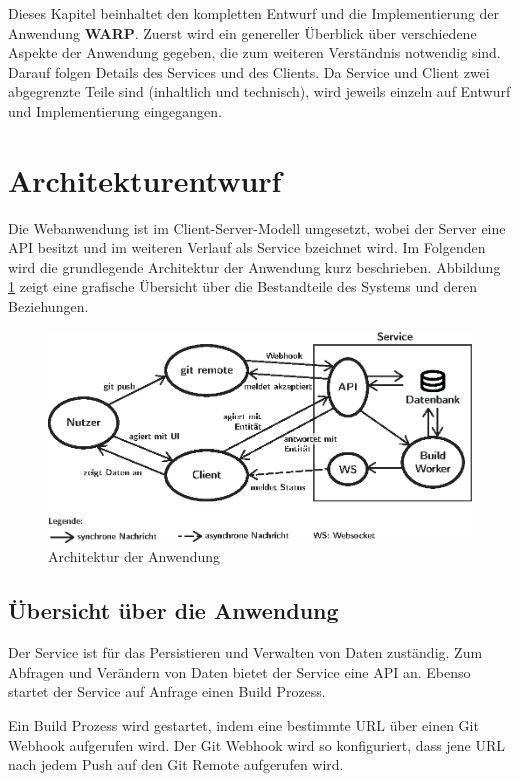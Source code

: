 Dieses Kapitel beinhaltet den kompletten Entwurf und die Implementierung der Anwendung \textbf{WARP}. Zuerst wird ein genereller Überblick über verschiedene Aspekte der Anwendung gegeben, die zum weiteren Verständnis notwendig sind. Darauf folgen Details des Services und des Clients. Da Service und Client zwei abgegrenzte Teile sind (inhaltlich und technisch), wird jeweils einzeln auf Entwurf und Implementierung eingegangen.

\section{Architekturentwurf}
\label{sec:architektur}

Die Webanwendung ist im Client-Server-Modell umgesetzt, wobei der Server eine API besitzt und im weiteren Verlauf als Service bzeichnet wird. Im Folgenden wird die grundlegende Architektur der Anwendung kurz beschrieben. Abbildung \ref{fig:architektur} zeigt eine grafische Übersicht über die Bestandteile des Systems und deren Beziehungen.

\begin{figure}[h]
  \caption{Architektur der Anwendung}
  \label{fig:architektur}
  \centering
    \includegraphics[width=\textwidth]{assets/systemarchitektur}
\end{figure}

\subsection{Übersicht über die Anwendung}
\label{subsec:uebersicht-anwendung}

Der Service ist für das Persistieren und Verwalten von Daten zuständig. Zum Abfragen und Verändern von Daten bietet der Service eine \ac{API} an. Ebenso startet der Service auf Anfrage einen Build Prozess.

Ein Build Prozess wird gestartet, indem eine bestimmte URL über einen Git Webhook aufgerufen wird. Der Git Webhook wird so konfiguriert, dass jene URL nach jedem Push auf den Git Remote aufgerufen wird.

